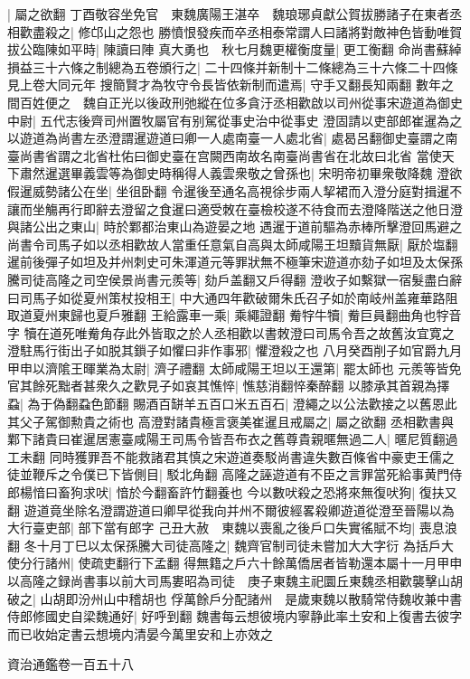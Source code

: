 |{
	屬之欲翻}
丁酉敬容坐免官　東魏廣陽王湛卒　魏琅琊貞獻公賀拔勝諸子在東者丞相歡盡殺之|{
	修邙山之怨也}
勝憤恨發疾而卒丞相泰常謂人曰諸將對敵神色皆動唯賀拔公臨陳如平時|{
	陳讀曰陣}
真大勇也　秋七月魏更權衡度量|{
	更工衡翻}
命尚書蘇綽損益三十六條之制總為五卷頒行之|{
	二十四條并新制十二條總為三十六條二十四條見上卷大同元年}
搜簡賢才為牧守令長皆依新制而遣焉|{
	守手又翻長知兩翻}
數年之間百姓便之　魏自正光以後政刑弛縱在位多貪汙丞相歡啟以司州從事宋遊道為御史中尉|{
	五代志後齊司州置牧屬官有别駕從事史治中從事史}
澄固請以吏部郎崔暹為之以遊道為尚書左丞澄謂暹遊道曰卿一人處南臺一人處北省|{
	處曷呂翻御史臺謂之南臺尚書省謂之北省杜佑曰御史臺在宫闕西南故名南臺尚書省在北故曰北省}
當使天下肅然暹選畢義雲等為御史時稱得人義雲衆敬之曾孫也|{
	宋明帝初畢衆敬降魏}
澄欲假暹威勢諸公在坐|{
	坐徂卧翻}
令暹後至通名高視徐步兩人挈裙而入澄分庭對揖暹不讓而坐觴再行即辭去澄留之食暹曰適受敇在臺檢校遂不待食而去澄降階送之他日澄與諸公出之東山|{
	時於鄴都治東山為遊晏之地}
遇暹于道前驅為赤棒所擊澄回馬避之尚書令司馬子如以丞相歡故人當重任意氣自高與太師咸陽王坦黷貨無厭|{
	厭於塩翻}
暹前後彈子如坦及并州刺史可朱渾道元等罪狀無不極筆宋遊道亦劾子如坦及太保孫騰司徒高隆之司空侯景尚書元羨等|{
	劾戶盖翻又戶得翻}
澄收子如繫獄一宿髮盡白辭曰司馬子如從夏州策杖投相王|{
	中大通四年歡破爾朱氏召子如於南岐州盖雍華路阻取道夏州東歸也夏戶雅翻}
王給露車一乘|{
	乘繩證翻}
觠牸牛犢|{
	觠巨員翻曲角也牸音字}
犢在道死唯觠角存此外皆取之於人丞相歡以書敇澄曰司馬令吾之故舊汝宜寛之澄駐馬行街出子如脱其鎻子如懼曰非作事邪|{
	懼澄殺之也}
八月癸酉削子如官爵九月甲申以濟隂王暉業為太尉|{
	濟子禮翻}
太師咸陽王坦以王還第|{
	罷太師也}
元羨等皆免官其餘死黜者甚衆久之歡見子如哀其憔悴|{
	憔慈消翻悴秦醉翻}
以膝承其首親為擇蝨|{
	為于偽翻蝨色節翻}
賜酒百缾羊五百口米五百石|{
	澄繩之以公法歡接之以舊恩此其父子駕御勲貴之術也}
高澄對諸貴極言褒美崔暹且戒屬之|{
	屬之欲翻}
丞相歡書與鄴下諸貴曰崔暹居憲臺咸陽王司馬令皆吾布衣之舊尊貴親暱無過二人|{
	暱尼質翻過工未翻}
同時獲罪吾不能救諸君其慎之宋遊道奏駁尚書違失數百條省中豪吏王儒之徒並鞭斥之令僕已下皆側目|{
	駁北角翻}
高隆之誣遊道有不臣之言罪當死給事黄門侍郎楊愔曰畜狗求吠|{
	愔於今翻畜許竹翻養也}
今以數吠殺之恐將來無復吠狗|{
	復扶又翻}
遊道竟坐除名澄謂遊道曰卿早從我向并州不爾彼經畧殺卿遊道從澄至晉陽以為大行臺吏部|{
	部下當有郎字}
己丑大赦　東魏以喪亂之後戶口失實徭賦不均|{
	喪息浪翻}
冬十月丁巳以太保孫騰大司徒高隆之|{
	魏齊官制司徒未嘗加大大字衍}
為括戶大使分行諸州|{
	使疏吏翻行下孟翻}
得無籍之戶六十餘萬僑居者皆勒還本屬十一月甲申以高隆之録尚書事以前大司馬婁昭為司徒　庚子東魏主祀圜丘東魏丞相歡襲擊山胡破之|{
	山胡即汾州山中稽胡也}
俘萬餘戶分配諸州　是歲東魏以散騎常侍魏收兼中書侍郎修國史自梁魏通好|{
	好呼到翻}
魏書每云想彼境内寧静此率土安和上復書去彼字而已收始定書云想境内清晏今萬里安和上亦效之

資治通鑑卷一百五十八
